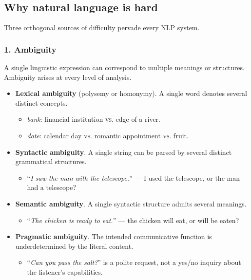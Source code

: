 \subsection{Why natural language is hard}

Three orthogonal sources of difficulty pervade every NLP system.

\subsubsection*{1. Ambiguity}

A single linguistic expression can correspond to multiple meanings or structures. Ambiguity arises at every level of analysis.

\begin{itemize}
    \item \textbf{Lexical ambiguity} (polysemy or homonymy). A single word denotes several distinct concepts.
    \begin{itemize}
        \item \emph{bank}: financial institution \textsc{vs.} edge of a river.
        \item \emph{date}: calendar day \textsc{vs.} romantic appointment \textsc{vs.} fruit.
    \end{itemize}
    \item \textbf{Syntactic ambiguity}. A single string can be parsed by several distinct grammatical structures.
    \begin{itemize}
        \item ``\emph{I saw the man with the telescope.}'' --- I used the telescope, or the man had a telescope?
    \end{itemize}
    \item \textbf{Semantic ambiguity}. A single syntactic structure admits several meanings.
    \begin{itemize}
        \item ``\emph{The chicken is ready to eat.}'' --- the chicken will eat, or will be eaten?
    \end{itemize}
    \item \textbf{Pragmatic ambiguity}. The intended communicative function is underdetermined by the literal content.
    \begin{itemize}
        \item ``\emph{Can you pass the salt?}'' is a polite request, not a yes/no inquiry about the listener's capabilities.
    \end{itemize}
\end{itemize}


